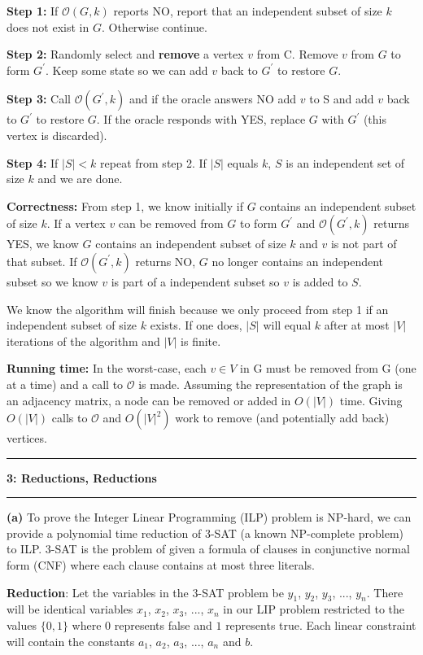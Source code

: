 \documentclass[11pt]{article}
\newcommand\question[2]{\vspace{.25in}\hrule\textbf{#1: #2}\vspace{.5em}\hrule\vspace{.10in}}
\renewcommand\part[1]{\vspace{.10in}\textbf{(#1)}}
\newcommand\correctness{\vspace{.10in}\textbf{Correctness: }}
\newcommand\runtime{\vspace{.10in}\textbf{Running time: }}
\begin{document}
\textbf{Step 1:} If $\mathcal{O}(G, k)$ reports NO, report that an independent subset of size $k$ does not exist in $G$. Otherwise continue.

\textbf{Step 2:} Randomly select and \textbf{remove} a vertex $v$ from C. Remove $v$ from $G$ to form $G^\prime$. Keep some state so we can add $v$ back to $G^\prime$ to restore $G$.

\textbf{Step 3:} Call $\mathcal{O}(G^\prime, k)$ and if the oracle answers NO add $v$ to S and add $v$ back to $G^\prime$ to restore $G$. If the oracle responds with YES, replace $G$ with $G^\prime$ (this vertex is discarded).

\textbf{Step 4:} If $|S| < k$ repeat from step 2. If $|S|$ equals $k$, $S$ is an independent set of size $k$ and we are done.

\correctness From step 1, we know initially if $G$ contains an independent subset of size $k$. If a vertex $v$ can be removed from $G$ to form $G^\prime$ and $\mathcal{O}(G^\prime, k)$ returns YES, we know $G$ contains an independent subset of size $k$ and $v$ is not part of that subset. If $\mathcal{O}(G^\prime, k)$ returns NO, $G$ no longer contains an independent subset so we know $v$ is part of a independent subset so $v$ is added to $S$.

	We know the algorithm will finish because we only proceed from step 1 if an independent subset of size $k$ exists. If one does, $|S|$ will equal $k$ after at most $|V|$ iterations of the algorithm and $|V|$ is finite.

\runtime In the worst-case, each $v \in V$ in G must be removed from G (one at a time) and a call to $\mathcal{O}$ is made. Assuming the representation of the graph is an adjacency matrix, a node can be removed or added in $O(|V|)$ time. Giving $O(|V|)$ calls to $\mathcal{O}$ and $O(|V|^2)$ work to remove (and potentially add back) vertices.

\question{3}{Reductions, Reductions}

\part{a} To prove the Integer Linear Programming (ILP) problem is NP-hard, we can provide a polynomial time reduction of 3-SAT (a known NP-complete problem) to ILP. 3-SAT is the problem of given a formula of clauses in conjunctive normal form (CNF) where each clause contains at most three literals.

\textbf{Reduction}: Let the variables in the 3-SAT problem be $y_1$, $y_2$, $y_3$, ..., $y_n$. There will be identical variables $x_1$, $x_2$, $x_3$, ..., $x_n$ in our LIP problem restricted to the values $\{0, 1\}$ where $0$ represents false and $1$ represents true. Each linear constraint will contain the constants $a_1$, $a_2$, $a_3$, ..., $a_n$ and $b$.
\end{document}
